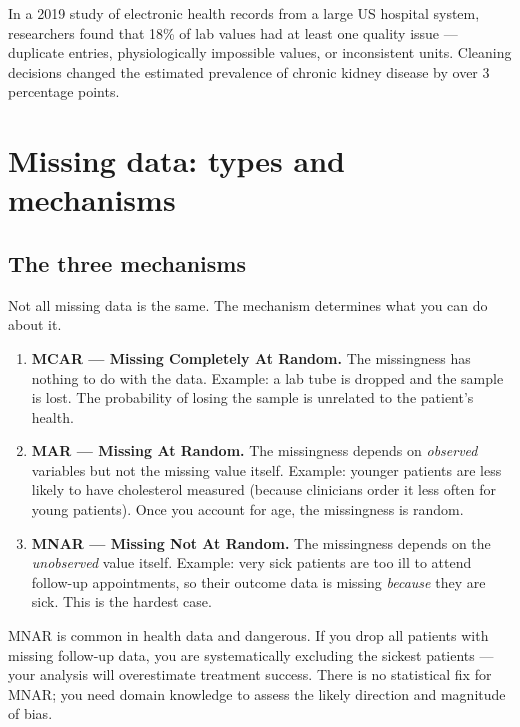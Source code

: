 \begin{clinicalnote}
In a 2019 study of electronic health records from a large US hospital system, researchers found that 18\% of lab values had at least one quality issue --- duplicate entries, physiologically impossible values, or inconsistent units. Cleaning decisions changed the estimated prevalence of chronic kidney disease by over 3 percentage points.
\end{clinicalnote}

\section{Missing data: types and mechanisms}

\subsection{The three mechanisms}

Not all missing data is the same. The mechanism determines what you can do about it.

\begin{enumerate}
  \item \textbf{MCAR --- Missing Completely At Random.} The missingness has nothing to do with the data. Example: a lab tube is dropped and the sample is lost. The probability of losing the sample is unrelated to the patient's health.
  \item \textbf{MAR --- Missing At Random.} The missingness depends on \emph{observed} variables but not the missing value itself. Example: younger patients are less likely to have cholesterol measured (because clinicians order it less often for young patients). Once you account for age, the missingness is random.
  \item \textbf{MNAR --- Missing Not At Random.} The missingness depends on the \emph{unobserved} value itself. Example: very sick patients are too ill to attend follow-up appointments, so their outcome data is missing \emph{because} they are sick. This is the hardest case.
\end{enumerate}

\begin{warningbox}
MNAR is common in health data and dangerous. If you drop all patients with missing follow-up data, you are systematically excluding the sickest patients --- your analysis will overestimate treatment success. There is no statistical fix for MNAR; you need domain knowledge to assess the likely direction and magnitude of bias.
\end{warningbox}

